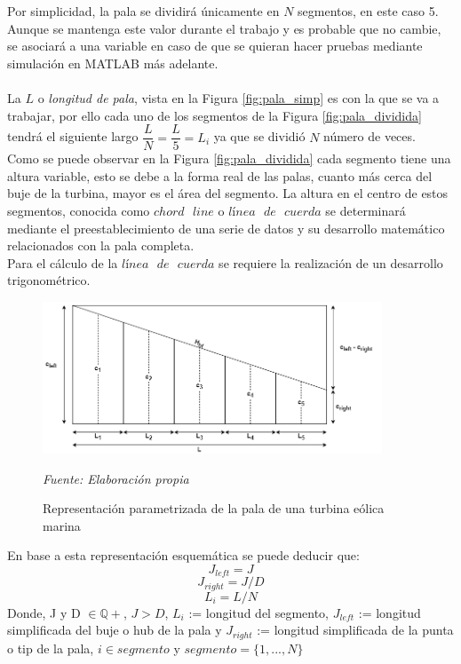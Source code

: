 Por simplicidad, la pala se dividirá únicamente en $N$ segmentos, en este caso 5. Aunque se mantenga este valor durante el trabajo y es probable que no cambie, se asociará a una variable en caso de que se quieran hacer pruebas mediante simulación en MATLAB más adelante. \\\\
    

La $L$ o \textit{longitud de pala}, vista en la Figura \ref{fig:pala_simp} es con la que se va a trabajar, por ello cada uno de los segmentos de la Figura \ref{fig:pala_dividida} tendrá el siguiente largo $\dfrac{L}{N} = \dfrac{L}{5} = L_i$  ya que se dividió $N$ número de veces. \\

Como se puede observar en la Figura \ref{fig:pala_dividida} cada segmento tiene una altura variable, esto se debe a la forma real de las palas, cuanto más cerca del buje de la turbina, mayor es el área del segmento. La altura en el centro de estos segmentos, conocida como $chord \text{ } line$ o $línea \text{ } de \text{ } cuerda$ se determinará mediante el preestablecimiento de una serie de datos y su desarrollo matemático relacionados con la pala completa.\\

Para el cálculo de la $línea \text{ } de \text{ } cuerda$ se requiere la realización de un desarrollo trigonométrico. 

\begin{figure}[H]
    \centering
    \includegraphics[width=0.9\textwidth]{images/planteo chord line.png}
    \caption{Representación parametrizada de la pala de una turbina eólica marina}
    \textit{Fuente: Elaboración propia}
    \label{fig:pala_desarrollo_chord}
\end{figure}



\begin{definicion}
En base a esta representación esquemática se puede deducir que:
$$ J_{left} = J$$
$$ J_{right} = J/D$$
$$ L_i = L/N$$
Donde,
\centering
J y D $\in \mathbb{Q+}$, \hspace{2pt} $J > D$, \hspace{2pt} $L_i$ := longitud del segmento,  $J_{left}$ := longitud simplificada del buje o hub de la pala y $J_{right}$ := longitud simplificada de la punta o tip de la pala, $i \in segmento$ y $segmento = \{1, ..., N\}$ 
\label{def_laterales_pala}
\end{definicion}


